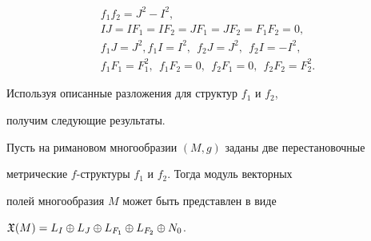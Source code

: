 \begin{equation}\label{alg1}


\begin{array}{c}


f_1f_2=J^2-I^2,\\[2mm]


IJ=IF_1=IF_2=JF_1=JF_2=F_1F_2=0, \\[2mm]


f_1J=J^2,f_1I=I^2,\ \ f_2J=J^2,\ \ f_2I=-I^2,\\[2mm]


f_1F_1=F_1^2,\ \ f_1F_2=0,\ \ f_2F_1=0,\ \ f_2F_2=F_2^2.


\end{array}


\end{equation}





Используя описанные разложения для структур $f_1$ и $f_2$, 


получим следующие результаты.





\begin{thm}\label{Red}


Пусть на римановом многообразии $(M,g)$ заданы две перестановочные


метрические $f$-структуры $f_1$ и $f_2$. Тогда модуль векторных


полей многообразия $M$ может быть представлен в виде


$\frak{X}(M)=L_I\oplus L_J\oplus L_{F_1}\oplus L_{F_2}\oplus N_0$.


\end{thm}





